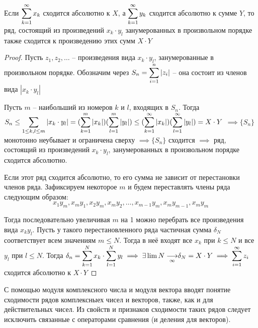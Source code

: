 \begin{theorem}
    Если $\displaystyle\sum_{k=1}^\infty x_k$ сходится абсолютно к $X$, а $\displaystyle\sum_{k=1}^\infty y_k$ сходится
    абсолютно к сумме $Y$, то ряд, состоящий из произведений $x_k \cdot y_l$
    занумерованных в произвольном порядке также сходится к произведению
    этих сумм $X \cdot Y$
\end{theorem}
\begin{proof}
    Пусть $z_1, z_2, \dots$ -- произведения вида $x_k \cdot y_l$, занумерованные
    в произвольном порядке. Обозначим через $S_n = \displaystyle\sum_{i = 1}^n |z_i|$ --
    она состоит из членов вида $|x_k \cdot y_l|$

    Пусть $m$ -- наибольший из номеров $k$ и $l$, входящих в $S_n$. Тогда
    $S_n \leq \displaystyle\sum_{1 \leq k, l \leq m} |x_k \cdot y_l|
    = (\displaystyle\sum_{k = 1}^m |x_k|) (\displaystyle\sum_{l = 1}^m |y_l|)
    \leq (\displaystyle\sum_{k = 1}^\infty |x_k|) (\displaystyle\sum_{l = 1}^\infty |y_l|) 
    = X \cdot Y$
    $\implies \{ S_n \}$ монотонно неубывает и ограничена сверху 
    $\implies \{ S_n \}$ сходится 
    $\implies$ ряд, состоящий из произведений $x_k \cdot y_l$, занумерованных
    в произвольном порядке сходится абсолютно.

    Если этот ряд сходится абсолютно, то его сумма не зависит от перестановки
    членов ряда. Зафиксируем некоторое $m$ и будем переставлять члены ряда
    следующим образом:
    \[ x_1 y_m, x_m y_1, x_2 y_m, x_m y_2, \dots, x_{m - 1} y_m, x_m y_{m - 1}, x_m y_m \]

    Тогда последовательно увеличивая $m$ на 1 можно перебрать все произведения
    вида $x_k y_l$. Пусть у такого перестановленного ряда частичная сумма
    $\delta_N$ соответствует всем значениям $m \leq N$. Тогда в неё входят все
    $x_k$ при $k \leq N$ и все $y_l$ при $l \leq N$.
    Тогда $\delta_n = \displaystyle\sum_{k = 1}^N x_k \cdot \displaystyle\sum_{l = 1}^N y_l
    \implies \exists \displaystyle\lim {N \underset{\infty}{\longrightarrow}} \delta_N = X \cdot Y
    \implies \displaystyle\sum_{i = 1}^\infty z_i$ сходится абсолютно к $X \cdot Y$
\end{proof}

\begin{remark}
    С помощью модуля комплексного числа и модуля вектора вводят понятие 
    сходимости рядов комплексныех чисел и векторов, также, как и для
    действительных чисел. Из свойств и признаков сходимости таких рядов следует 
    исключить связанные с операторами сравнения (и деления для векторов).
\end{remark}